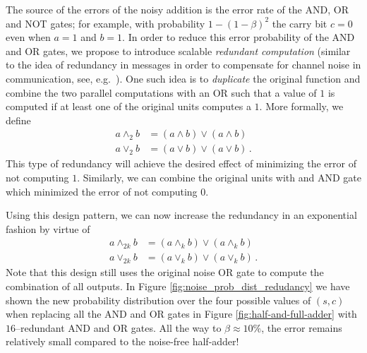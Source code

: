 \label{sec:redundant_adders}
The source of the errors of the noisy addition is the error rate of the AND, OR and NOT gates; for example, with probability $1-(1-\beta)^2$ the carry bit $c=0$ even when $a=1$ and $b=1$. In order to reduce this error probability of the AND and OR gates, we propose to introduce scalable {\em redundant computation} (similar to the idea of redundancy in messages in order to compensate for channel noise in communication, see, e.g.\ \cite{Sha1948k}). One such idea is to {\em duplicate} the original function and combine the two parallel computations with an OR such that a value of $1$ is computed if at least one of the original units computes a $1$. More formally, we define
\begin{align}
    a \land_2 b & = (a \land b) \lor (a \land b) \\
    a \lor_2 b & = (a \lor b) \lor (a \lor b) \,.
\end{align}
This type of redundancy will achieve the desired effect of minimizing the error of not computing $1$. Similarly, we can combine the original units with and AND gate which minimized the error of not computing $0$. 

Using this design pattern, we can now increase the redundancy in an exponential fashion by virtue of 
\begin{align}
    a \land_{2k} b & = (a \land_k b) \lor (a \land_k b) \\
    a \lor_{2k} b & = (a \lor_k b) \lor (a \lor_k b) \,.
\end{align}
Note that this design still uses the original noise OR gate to compute the combination of all outputs. In Figure \ref{fig:noise_prob_dist_redudancy} we have shown the new probability distribution over the four possible values of $(s,c)$ when replacing all the AND and OR gates in Figure \ref{fig:half-and-full-adder} with $16$--redundant AND and OR gates. All the way to $\beta \approx 10\%$, the error remains relatively small compared to the noise-free half-adder!

